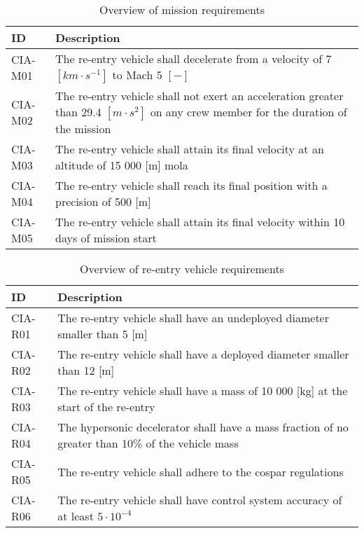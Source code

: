 \begin{table}[h]
	\caption{Overview of mission requirements}
	\label{tab:misreq} 
	\begin{tabular}{|p{}|p{}|}
    \hline
    ID          & Description                                                                                                      \\ \hline \hline
    CIA-M01& The re-entry vehicle shall decelerate from a velocity of 7 $[km\cdot s ^{-1}]$ to Mach 5 $[-]$  \\ \hline
    CIA-M02 & The re-entry vehicle shall not exert an acceleration greater than 29.4 $[m \cdot s^{2}]$ on any crew member for the duration of the mission			\\ \hline
    	CIA-M03 & The re-entry vehicle shall attain its final velocity at an altitude of 15 000 [m] \gls{mola} \\ \hline
    	CIA-M04 & The re-entry vehicle shall reach its final position with a precision of 500 [m]\\ \hline
    	CIA-M05 & The re-entry vehicle shall attain its final velocity within 10 days of mission start \\ \hline
    \end{tabular}
\end{table}

\begin{table}[h]
	\caption{Overview of re-entry vehicle requirements} 
	\label{tab:vehreq}
	\begin{tabular}{|p{}|p{}|}
	    \hline
	    ID          & Description                                                                                                      \\ \hline \hline
	CIA-R01 & The re-entry vehicle shall have an undeployed diameter smaller than 5 [m]                         				            \\ \hline
	CIA-R02 & The re-entry vehicle shall have a deployed diameter smaller than 12 [m]                         				            \\ \hline	
	CIA-R03 & The re-entry vehicle shall have a mass of 10 000 [kg] at the start of the re-entry                       				            \\ \hline
	CIA-R04 & The hypersonic decelerator shall have a mass fraction of no greater than 10\% of the vehicle mass  \\ \hline
	CIA-R05 &  The re-entry vehicle shall adhere to the \gls{cospar} regulations \\ \hline
	CIA-R06 &  The re-entry vehicle shall have control system accuracy of at least $5\cdot 10^{-4}$  \\ \hline
    \end{tabular}
\end{table}




